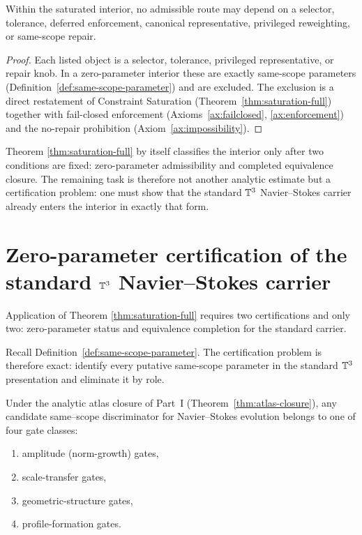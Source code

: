 \begin{proposition}\label{prop:zero-parameter-excludes}
Within the saturated interior, no admissible route may depend on a selector, tolerance, deferred
enforcement, canonical representative, privileged reweighting, or same-scope repair.
\end{proposition}

\begin{proof}
Each listed object is a selector, tolerance, privileged representative, or repair knob. In a zero-parameter interior
these are exactly same-scope parameters (Definition~\ref{def:same-scope-parameter}) and are excluded. The exclusion is
a direct restatement of Constraint Saturation (Theorem~\ref{thm:saturation-full}) together with fail-closed enforcement
(Axioms~\ref{ax:failclosed}, \ref{ax:enforcement}) and the no-repair prohibition (Axiom~\ref{ax:impossibility}).
\end{proof}

\begin{remark}
Theorem \ref{thm:saturation-full} by itself classifies the interior only after two conditions are fixed:
zero-parameter admissibility and completed equivalence closure. The remaining task is therefore not
another analytic estimate but a certification problem: one must show that the standard $\mathbb{T}^3$
Navier--Stokes carrier already enters the interior in exactly that form.
\end{remark}


\section{Zero-parameter certification of the standard \texorpdfstring{$\mathbb{T}^3$}{T3} Navier--Stokes carrier}
Application of Theorem \ref{thm:saturation-full} requires two certifications and only two: zero-parameter
status and equivalence completion for the standard carrier.

Recall Definition~\ref{def:same-scope-parameter}.
The certification problem is therefore exact: identify every putative same-scope parameter in the
standard $\mathbb{T}^3$ presentation and eliminate it by role.



\begin{theorem}
\label{thm:gate-classification}
Under the analytic atlas closure of Part~I (Theorem~\ref{thm:atlas-closure}), any candidate same--scope discriminator for Navier--Stokes evolution belongs to one of four gate classes:
\begin{enumerate}[label=(\roman*), leftmargin=2.2em]
\item amplitude (norm-growth) gates,
\item scale-transfer gates,
\item geometric-structure gates,
\item profile-formation gates.
\end{enumerate}
\end{theorem}

